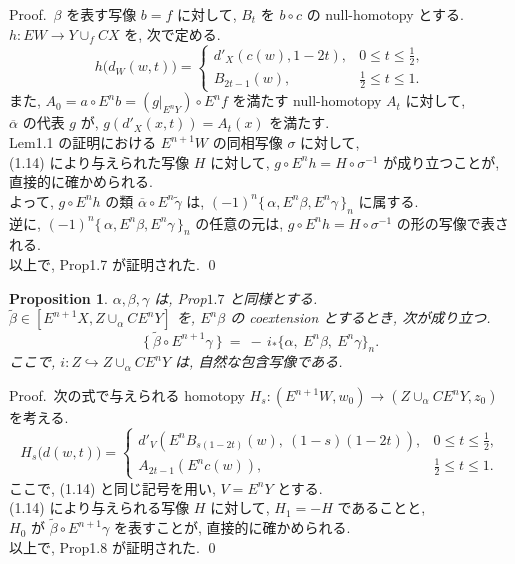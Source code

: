 \documentclass[12pt, leqno]{ltjsarticle}
\newcommand{\Ex}{E}        %
\newcommand{\todai}[2][]{\{\,#2\,\}_{#1}}      %
\numberwithin{equation}{section}
\theoremstyle{plain}
\newtheorem{proposition}[theorem]{Proposition}
\theoremstyle{definition}
\theoremstyle{remark}
\begin{document}
Proof.\
\(\beta\) を表す写像 \(b = f\) に対して, 
\(B_t\) を \(b\circ c\) の null-homotopy とする.\\
$h:EW\to Y\cup_f CX$ を,
次で定める.
\[
h\bigl(d_W(w,t)\bigr)=
\begin{cases}
d'_X(c(w),1-2t), & 0\le t\le \tfrac12,\\
B_{2t-1}(w), & \tfrac12\le t\le 1.
\end{cases}
\]
また, \(A_0 = a\circ E^n b = (g|_{E^n Y})\circ E^n f\)
を満たす null-homotopy \(A_t\) に対して,\\
\(\overline{\alpha}\) の代表 \(g\) が,
\(g(d'_X(x, t)) = A_t(x)\) を満たす.\\
Lem1.1 の証明における \(E^{n+1}W\) の同相写像 \(\sigma\) に対して,\\
(1.14) により与えられた写像 \(H\) に対して,
\(g\circ E^n h = H\circ \sigma^{-1}\) が成り立つことが,
直接的に確かめられる.\\
よって,
\(g\circ E^n h\) の類 \(\overline{\alpha}\circ E^n\widetilde{\gamma}\)
は, \((-1)^n\todai[n]{\alpha, E^n\beta, E^n\gamma}\) に属する.\\
逆に,
\((-1)^n\todai[n]{\alpha, E^n\beta, E^n\gamma}\)
の任意の元は, 
\(g\circ E^n h = H\circ\sigma^{-1}\)
の形の写像で表される.\\
以上で, Prop1.7 が証明された.
\qed


\begin{proposition}\label{prop:1-8}
$\alpha,\beta,\gamma$ は, Prop$1.7$ と同様とする. \\
$\widetilde{\beta}\in[\Ex^{n+1}X, Z\cup_\alpha C\Ex^nY]$ を,
$E^n\beta$ の \emph{coextension} とするとき,
次が成り立つ.
\[
\bigl\{\ \widetilde{\beta}\circ\Ex^{n+1}\gamma\ \bigr\}
\ =\
-\,i_*\bigl\{\alpha,\ \Ex^n\beta,\ \Ex^n\gamma\bigr\}_n.
\]
ここで, $i:Z\hookrightarrow Z\cup_\alpha C\Ex^nY$ は,
自然な包含写像である. 
\end{proposition}

Proof.\
次の式で与えられる homotopy  
\(H_s:(E^{n+1}W,w_0)\to (Z\cup_\alpha CE^n Y, z_0)\)
を考える.
\[
H_s\bigl(d(w,t)\bigr)=
\begin{cases}
d'_V\!\left(E^nB_{s(1-2t)}(w),\ (1-s)(1-2t)\right), & 0\le t\le \tfrac12,\\
A_{2t-1}\!\left(E^n c(w)\right), & \tfrac12\le t\le 1.
\end{cases}
\]
ここで, (1.14) と同じ記号を用い, \(V= E^n Y\) とする.\\
(1.14) により与えられる写像 \(H\) に対して, 
\(H_1 = -H\) であることと,\\
\(H_0\) が 
\(\widetilde{\beta}\circ E^{n+1}\gamma\)
を表すことが, 
直接的に確かめられる.\\
以上で, Prop1.8 が証明された.
\qed
\end{document}
